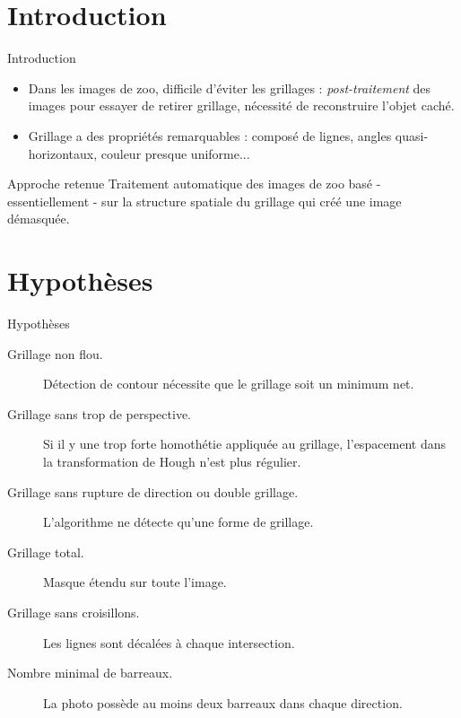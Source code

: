 \section*{Introduction}

\begin{frame}{Introduction}
\begin{itemize}
\item Dans les images de zoo, difficile d'éviter les grillages : \emph{post-traitement} des images pour essayer de retirer grillage, nécessité de reconstruire l'objet caché.
\item Grillage a des propriétés remarquables : composé de lignes, angles quasi-horizontaux, couleur presque uniforme...
\end{itemize}
\begin{block}{Approche retenue}
Traitement automatique des images de zoo basé - essentiellement - sur la structure spatiale du grillage qui créé une image \og démasquée\fg.
\end{block}
\end{frame}




\section{Hypothèses}

\begin{frame}{Hypothèses}
\begin{description}
\item[Grillage non flou. ]Détection de contour nécessite que le grillage soit un minimum net.

\item[Grillage sans trop de perspective. ]Si il y une trop forte homothétie appliquée au grillage, l'espacement dans la transformation de Hough n'est plus régulier.

\item[Grillage sans rupture de direction ou double grillage. ]L'algorithme ne détecte qu'une forme de grillage.

\item[Grillage total. ]Masque étendu sur toute l'image.

\item[Grillage sans \og croisillons\fg. ]Les lignes sont décalées à chaque intersection.

\item[Nombre minimal de barreaux. ]La photo possède au moins deux barreaux dans chaque direction.
\end{description}
\end{frame}



